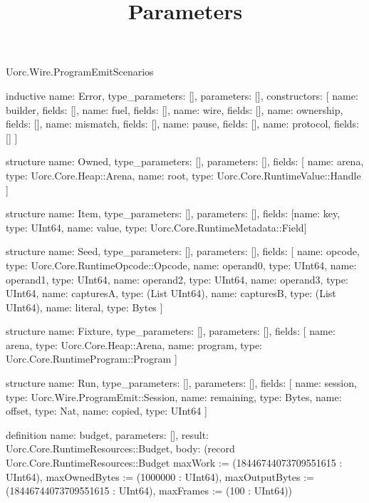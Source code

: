 \begin{lexlean}{Uorc.Wire.ProgramEmitScenarios}
\title{Parameters}
\begin{semanticmodule}
inductive{
  name: Error,
  type_parameters: [],
  parameters: [],
  constructors: [
    {name: builder, fields: []},
    {name: fuel, fields: []},
    {name: wire, fields: []},
    {name: ownership, fields: []},
    {name: mismatch, fields: []},
    {name: pause, fields: []},
    {name: protocol, fields: []}
  ]
}

structure{
  name: Owned,
  type_parameters: [],
  parameters: [],
  fields: [
    {name: arena, type: Uorc.Core.Heap::Arena},
    {name: root, type: Uorc.Core.RuntimeValue::Handle}
  ]
}

structure{
  name: Item,
  type_parameters: [],
  parameters: [],
  fields: [{name: key, type: UInt64}, {name: value, type: Uorc.Core.RuntimeMetadata::Field}]
}

structure{
  name: Seed,
  type_parameters: [],
  parameters: [],
  fields: [
    {name: opcode, type: Uorc.Core.RuntimeOpcode::Opcode},
    {name: operand0, type: UInt64},
    {name: operand1, type: UInt64},
    {name: operand2, type: UInt64},
    {name: operand3, type: UInt64},
    {name: capturesA, type: (List UInt64)},
    {name: capturesB, type: (List UInt64)},
    {name: literal, type: Bytes}
  ]
}

structure{
  name: Fixture,
  type_parameters: [],
  parameters: [],
  fields: [
    {name: arena, type: Uorc.Core.Heap::Arena},
    {name: program, type: Uorc.Core.RuntimeProgram::Program}
  ]
}

structure{
  name: Run,
  type_parameters: [],
  parameters: [],
  fields: [
    {name: session, type: Uorc.Wire.ProgramEmit::Session},
    {name: remaining, type: Bytes},
    {name: offset, type: Nat},
    {name: copied, type: UInt64}
  ]
}

definition{
  name: budget,
  parameters: [],
  result: Uorc.Core.RuntimeResources::Budget,
  body: (record Uorc.Core.RuntimeResources::Budget {maxWork := (18446744073709551615 : UInt64), maxOwnedBytes := (1000000 : UInt64), maxOutputBytes := (18446744073709551615 : UInt64), maxFrames := (100 : UInt64)})
}


\end{semanticmodule}
\end{lexlean}
